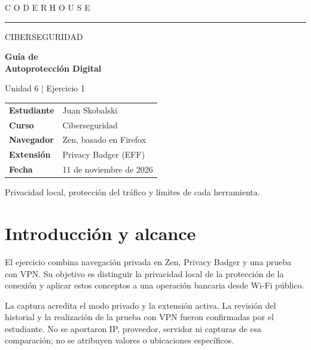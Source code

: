 \documentclass[11pt,a4paper]{article}
\begin{document}
\thispagestyle{empty}\vspace*{1cm}
{\large\color{turquesa}C O D E R H O U S E}\par\rule{\textwidth}{0.5pt}\vspace{2cm}
{\Large\color{gris}CIBERSEGURIDAD}\par
{\Huge\bfseries\color{azul}Guía de\\Autoprotección Digital}\par
{}\par
\vspace{1cm}Unidad 6 | Ejercicio 1
\vfill
\begin{tabularx}{\textwidth}{lX}
\textbf{Estudiante} & Juan Skobalski\\
\textbf{Curso} & Ciberseguridad\\
\textbf{Navegador} & Zen, basado en Firefox\\
\textbf{Extensión} & Privacy Badger (EFF)\\
\textbf{Fecha} & 11 de noviembre de 2026
\end{tabularx}
\vspace{1cm}\par Privacidad local, protección del tráfico y límites de cada herramienta.
\clearpage
\section{Introducción y alcance}
El ejercicio combina navegación privada en Zen, Privacy Badger y una prueba con VPN. Su objetivo es distinguir la privacidad local de la protección de la conexión y aplicar estos conceptos a una operación bancaria desde Wi-Fi público.

La captura acredita el modo privado y la extensión activa. La revisión del historial y la realización de la prueba con VPN fueron confirmadas por el estudiante. No se aportaron IP, proveedor, servidor ni capturas de esa comparación; no se atribuyen valores o ubicaciones específicos.
\end{document}
